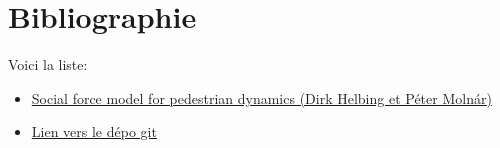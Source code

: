 \documentclass[a4paper,12pt]{article}
\begin{document}
\newpage



\section{Bibliographie}

Voici la liste:

\vspace{1em}

\begin{itemize}
	\item \href{https://journals.aps.org/pre/abstract/10.1103/PhysRevE.51.4282}{Social force model for pedestrian dynamics (Dirk Helbing et Péter Molnár)}
	\item \href{https://github.com/antoninnad/etude_des_foules}{Lien vers le dépo git}
\end{itemize}
\end{document}
